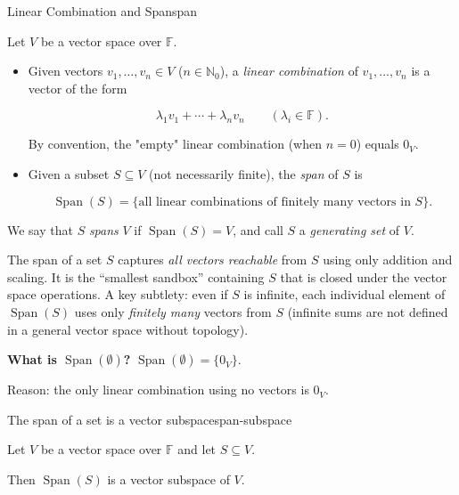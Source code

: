 \begin{definition}{Linear Combination and Span}{span}

Let $V$ be a vector space over $\mathbb{F}$.

\begin{itemize}[leftmargin=*]

\item Given vectors $v_1,\dots,v_n\in V$ ($n\in\mathbb{N}_0$), a \emph{linear combination} of $v_1,\dots,v_n$ is a vector of the form

\[
\lambda_1 v_1+\cdots+\lambda_n v_n
\qquad(\lambda_i\in\mathbb{F}).
\]

By convention, the "empty" linear combination (when $n=0$) equals $0_V$.

\item Given a subset $S\subseteq V$ (not necessarily finite), the \emph{span} of $S$ is

\[
\operatorname{Span}(S)=\{\text{all linear combinations of finitely many vectors in }S\}.
\]

\end{itemize}

We say that $S$ \emph{spans} $V$ if $\operatorname{Span}(S)=V$, and call $S$ a \emph{generating set} of $V$.

\end{definition}

The span of a set $S$ captures \emph{all vectors reachable} from $S$ using only addition and scaling.  It is the ``smallest sandbox'' containing $S$ that is closed under the vector space operations.
A key subtlety: even if $S$ is infinite, each individual element of $\operatorname{Span}(S)$ uses only \emph{finitely many} vectors from $S$ (infinite sums are not defined in a general vector space without topology).

\begin{keyformula}

\textbf{What is $\operatorname{Span}(\emptyset)$?} \quad $\operatorname{Span}(\emptyset)=\{0_V\}$.

\medskip

Reason: the only linear combination using no vectors is $0_V$.

\end{keyformula}

\begin{theorem}{The span of a set is a vector subspace}{span-subspace}

Let $V$ be a vector space over $\mathbb{F}$ and let $S\subseteq V$.

Then $\operatorname{Span}(S)$ is a vector subspace of $V$.

\end{theorem}

